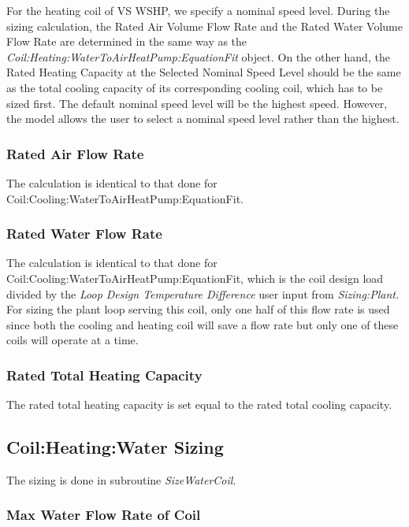 For the heating coil of VS WSHP, we specify a nominal speed level. During the sizing calculation, the Rated Air Volume Flow Rate and the Rated Water Volume Flow Rate are determined in the same way as the \emph{Coil:Heating:WaterToAirHeatPump:EquationFit} object. On the other hand, the Rated Heating Capacity at the Selected Nominal Speed Level should be the same as the total cooling capacity of its corresponding cooling coil, which has to be sized first. The default nominal speed level will be the highest speed. However, the model allows the user to select a nominal speed level rather than the highest.

\subsubsection{Rated Air Flow Rate}\label{rated-air-flow-rate-3}

The calculation is identical to that done for Coil:Cooling:WaterToAirHeatPump:EquationFit.

\subsubsection{Rated Water Flow Rate}\label{rated-water-flow-rate-3}

The calculation is identical to that done for Coil:Cooling:WaterToAirHeatPump:EquationFit, which is the coil design load divided by the \emph{Loop Design Temperature Difference} user input from \emph{Sizing:Plant.} For sizing the plant loop serving this coil, only one half of this flow rate is used since both the cooling and heating coil will save a flow rate but only one of these coils will operate at a time.

\subsubsection{Rated Total Heating Capacity}\label{rated-total-heating-capacity-1}

The rated total heating capacity is set equal to the rated total cooling capacity.

\subsection{Coil:Heating:Water Sizing}\label{coilheatingwater-sizing}

The sizing is done in subroutine \emph{SizeWaterCoil}.

\subsubsection{Max Water Flow Rate of Coil}\label{max-water-flow-rate-of-coil-1}

